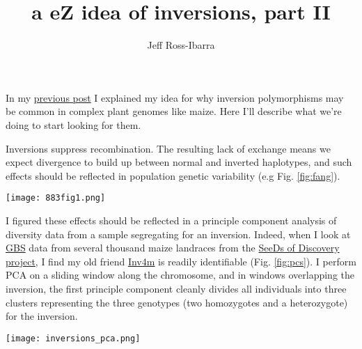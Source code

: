 \documentclass[]{article}
\begin{document}
\title{a eZ idea of inversions, part II}
\author{Jeff Ross-Ibarra}
\maketitle

In my \href{https://docs.google.com/viewer?url=https://github.com/RILAB/fruitcase/raw/master/blogs/FC002.pdf}{previous post} I explained my idea for why inversion polymorphisms may be common in complex plant genomes like maize. 
Here I'll describe what we're doing to start looking for them.

Inversions suppress recombination. 
The resulting lack of exchange means we expect divergence to build up between normal and inverted haplotypes, and such effects should be reflected in population genetic variability (e.g Fig. \ref{fig:fang}).

\begin{SCfigure}[][h!]   
   \texttt{[image: 883fig1.png]}
   \caption{The impact of an inversion on diversity. Figure from \href{http://www.genetics.org/content/191/3/883}{Fang et al. 2012} showing reduced haplotype diversity, elevated $F_{ST}$ between haplotypes, increased LD, and decreased rates of crossover inside a large inversion on maize chromosome 1.} 
    \label{fig:fang}
\end{SCfigure}

I figured these effects should be reflected in a principle component analysis of diversity data from a sample segregating for an inversion.  
Indeed, when I look at \href{http://www.ncbi.nlm.nih.gov/pmc/articles/PMC3087801/}{GBS} data from several thousand maize landraces from the \href{http://seedsofdiscovery.org/maize/}{SeeDs of Discovery project}, I find my old friend \href{http://gbe.oxfordjournals.org/content/5/9/1594.full}{Inv4m} is readily identifiable (Fig. \ref{fig:pcs}). 
I perform PCA on a sliding window along the chromosome, and in windows overlapping the inversion, the first principle component cleanly divides all individuals into three clusters representing the three genotypes (two homozygotes and a heterozygote) for the inversion.

\begin{figure*}[h]   
  \begin{center}
   \texttt{[image: inversions\_pca.png]}
   \caption{ The first two principal components of a PCA on individuals from the maize SeeDs of diversity data, plotted in 5Mb windows for part of Chr. 4. You can see a high-res version at the 1Mb scale \href{https://github.com/RILAB/fruitcase/blob/master/figures/inversion_scan.pdf}{here}.} 
    \label{fig:pcs}
  \end{center}
\end{figure*}
\end{document}
